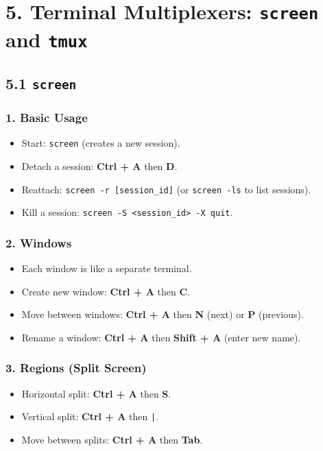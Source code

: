 \documentclass[a4paper]{report}
\begin{document}
    \section*{5. Terminal Multiplexers: \texttt{screen} and \texttt{tmux}}

    \subsection*{5.1 \texttt{screen}}
    
    \subsubsection*{1. Basic Usage}
    \begin{itemize}
        \item Start: \texttt{screen} (creates a new session).
        \item Detach a session: \textbf{Ctrl + A} then \textbf{D}.
        \item Reattach: \texttt{screen -r [session\_id]} (or \texttt{screen -ls} to list sessions).
        \item Kill a session: \texttt{screen -S <session\_id> -X quit}.
    \end{itemize}
    
    \subsubsection*{2. Windows}
    \begin{itemize}
        \item Each window is like a separate terminal.
        \item Create new window: \textbf{Ctrl + A} then \textbf{C}.
        \item Move between windows: \textbf{Ctrl + A} then \textbf{N} (next) or \textbf{P} (previous).
        \item Rename a window: \textbf{Ctrl + A} then \textbf{Shift + A} (enter new name).
    \end{itemize}
    
    \subsubsection*{3. Regions (Split Screen)}
    \begin{itemize}
        \item Horizontal split: \textbf{Ctrl + A} then \textbf{S}.
        \item Vertical split: \textbf{Ctrl + A} then \texttt{|}.
        \item Move between splits: \textbf{Ctrl + A} then \textbf{Tab}.
    \end{itemize}
    
\end{document}
